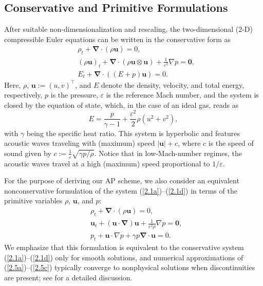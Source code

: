 \documentclass[A4paper,12pt,twoside]{article}
\numberwithin{equation}{section}
\numberwithin{figure}{section}
\numberwithin{table}{section}
\def\bnabla{\bm{\nabla}}
\newcommand{\ve}{\varepsilon}
\newcommand\eref[1]{(\ref{#1})}
\begin{document}
\subsection{Conservative and Primitive Formulations}\label{sec21}
After suitable non-dimensionalization and rescaling, the two-dimensional (2-D) compressible Euler equations can be written in the
conservative form as
\begin{align}
&\rho_t+\bnabla\!\cdot\!(\rho\bm u)=0,\label{2.1a}\\
&(\rho\bm u)_t+\bnabla\!\cdot\!(\rho\bm u\otimes\bm u)+\frac{1}{\ve^2}\nabla p=\bm0,\label{2.1b}\\
&E_t+\bnabla\!\cdot\!((E+p)\bm u)=0.\label{2.1c}
\end{align}
Here, $\rho$, $\bm u:=(u,v)^\top$, and $E$ denote the density, velocity, and total energy, respectively, $p$ is the pressure, $\ve$ is the 
reference Mach number, and the system is closed by the equation of state, which, in the case of an ideal gas, reads as
\begin{equation}
E=\frac{p}{\gamma-1}+\frac{\ve^2}{2}\rho(u^2+v^2),
\label{2.1d}
\end{equation}
with $\gamma$ being the specific heat ratio. This system is hyperbolic and features acoustic waves traveling with (maximum) speed
$|\bm u|+c$, where $c$ is the speed of sound given by $c:=\frac{1}{\ve}\sqrt{\gamma p/\rho}$. Notice that in low-Mach-number regimes, the
acoustic waves travel at a high (maximum) speed proportional to $1/\ve$.

For the purpose of deriving our AP scheme, we also consider an equivalent nonconservative formulation of the system \eref{2.1a}--\eref{2.1d}
in terms of the primitive variables $\rho$, $\bm u$, and $p$:
\begin{align}
&\rho_t+\bnabla\!\cdot\!(\rho\bm u)=0,\label{2.5a}\\
&\bm u_t+(\bm u\!\cdot\!\bnabla)\bm u+\frac{1}{\ve^2\rho}\nabla p=\bm0,\label{2.5b}\\
&p_t+\bm u\!\cdot\!\nabla p+\gamma p\bnabla\!\cdot\!\bm u=0.\label{2.5c}
\end{align}
We emphasize that this formulation is equivalent to the conservative system \eref{2.1a}--\eref{2.1d} only for smooth solutions, and
numerical approximations of \eref{2.5a}--\eref{2.5c} typically converge to nonphysical solutions when discontinuities are present; see 
\cite{abgrall2010comment,HouLeF} for a detailed discussion.
\end{document}
